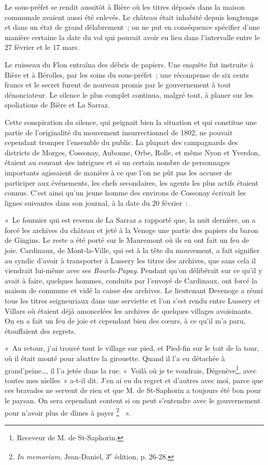 \documentclass[french,twoside]{book} %
\newenvironment{quoteblock}%
  {\begin{quoting}}
  {\end{quoting}}
\newenvironment{quotebar}{%
    \def\FrameCommand{{\color{rubric!10!}\vrule width 0.5em} \hspace{0.9em}}%
    \def\OuterFrameSep{\itemsep} %
    \MakeFramed {\advance\hsize-\width \FrameRestore}
  }%
  {%
    \endMakeFramed
  }
\renewenvironment{quoteblock}%
  {%
    \savenotes
    \setstretch{0.9}
    \normalfont
    \begin{quotebar}
  }
  {%
    \end{quotebar}
    \spewnotes
  }
\begin{document}
\noindent Le sous-préfet se rendit aussitôt à Bière où les titres déposés dans la maison communale avaient aussi été enlevés. Le château était inhabité depuis longtemps et dans un état de grand délabrement ; on ne put en conséquence spécifier d’une manière certaine la date du vol qui pouvait avoir eu lieu dans l’intervalle entre le 27 février et le 17 mars.\par
Le ruisseau du Flon entraîna des débris de papiers. Une enquête fut instruite à Bière et à Bérolles, par les soins du sous-préfet ; une récompense de six cents francs et le secret furent de nouveau promis par le gouvernement à tout dénonciateur. Le silence le plus complet continua, malgré tout, à planer sur les spoliations de Bière et La Sarraz.\par
Cette conspiration du silence, qui peignait bien la situation et qui constitue une partie de l’originalité du mouvement insurrectionnel de 1802, ne pouvait cependant tromper l’ensemble du public. La plupart des campagnards des districts de Morges, Cossonay, Aubonne, Orbe, Rolle, et même Nyon et Yverdon, étaient au courant des intrigues et si un certain nombre de personnages importants agissaient de manière à ce que l’on ne pût pas les accuser de participer aux événements, les chefs secondaires, les agents les plus actifs étaient connus. C’est ainsi qu’un jeune homme des environs de Cossonay écrivait les lignes suivantes dans son journal, à la date du 20 février :\par

\begin{quoteblock}
 \noindent « Le fournier qui est revenu de La Sarraz a rapporté que, la nuit dernière, on a forcé les archives du château et jeté à la Venoge une partie des papiers du baron de Gingins. Le reste a été porté sur le Mauremont où ils en ont fait un feu de joie. Cardinaux, de Mont-la-Ville, qui est à la tête du mouvement, a fait signifier au syndic d’avoir à transporter à Lussery les titres des archives, que sans cela il viendrait lui-même avec ses \emph{Bourla-Papay}. Pendant qu’on délibérait sur ce qu’il y avait à faire, quelques hommes, conduits par l’envoyé de Cardinaux, ont forcé la maison de commune et vidé la caisse des archives. Le lieutenant Devenoge a réuni tous les titres seigneuriaux dans une serviette et l’on s’est rendu entre Lussery et Villars où étaient déjà amoncelées les archives de quelques villages avoisinants. On en a fait un feu de joie et cependant bien des cœurs, à ce qu’il m’a paru, étouffaient des regrets.\par
 « Au retour, j’ai trouvé tout le village sur pied, et Pied-fin sur le toit de la tour, où il était monté pour abattre la girouette. Quand il l’a eu détachée à grand’peine…, il l’a jetée dans la rue. « Voilà où je te voudrais, Dégenève\footnote{Receveur de M. de St-Saphorin.}, avec toutes mes nielles » a-t-il dit. J’en ai eu du regret et d’autres avec moi, parce que ces bravades ne servent de rien et que M. de St-Saphorin a toujours été bon pour le paysan. On sera cependant content si on peut s’entendre avec le gouvernement pour n’avoir plus de dîmes à payer \footnote{\emph{In memoriam}, Jean-Daniel, 3\textsuperscript{e} édition, p. 26-28.}  ».
 \end{quoteblock}
\end{document}
